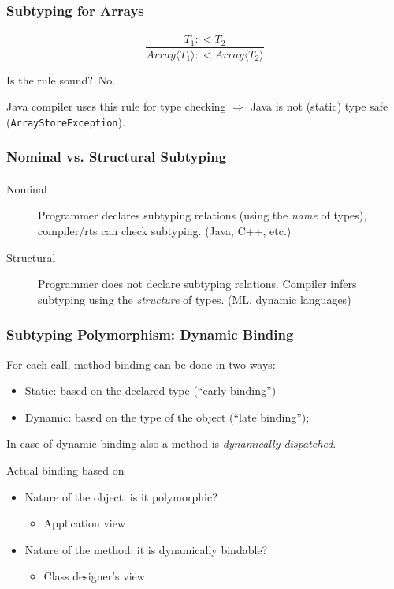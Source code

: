 \documentclass{beamer}
\begin{document}
\begin{frame}
\frametitle{Subtyping for Arrays}
\framesubtitle{}

\[
\frac{T_1 :< T_2 }{Array ⟨T_1⟩ :< Array ⟨ T_2 ⟩}
\]

Is the rule sound?\pause\ \alert{No.}

\pause

Java compiler uses this rule for type checking $\Rightarrow$ Java is
not (static) type safe (\texttt{ArrayStoreException}).


\end{frame}

\begin{frame}
\frametitle{Nominal vs. Structural Subtyping}
\framesubtitle{}

\begin{description}

\item[Nominal] Programmer declares subtyping relations (using the \emph{name}
of types), compiler/rts can check subtyping. (Java, C++, etc.)

\item[Structural] Programmer does not declare subtyping relations. Compiler
infers subtyping using the \emph{structure} of types. (ML, dynamic languages)

\end{description}

\end{frame}



\begin{frame}[fragile]
\frametitle{Subtyping Polymorphism: Dynamic Binding}

For each call, method binding can be done in two ways:
\begin{itemize}
\item Static: based on the declared type (``early binding'')
\item Dynamic: based on the type of the object  (``late binding'');
\end{itemize}

In case of dynamic binding also a method is \emph{dynamically
  dispatched}.

\bigskip

Actual binding based on
\begin{itemize}
\item Nature of the object: is it polymorphic?
\begin{itemize}
\item Application view
\end{itemize}
\item Nature of the method: it is dynamically bindable?
\begin{itemize}
\item Class designer's view
\end{itemize}
\end{itemize}
\end{frame}
\end{document}
